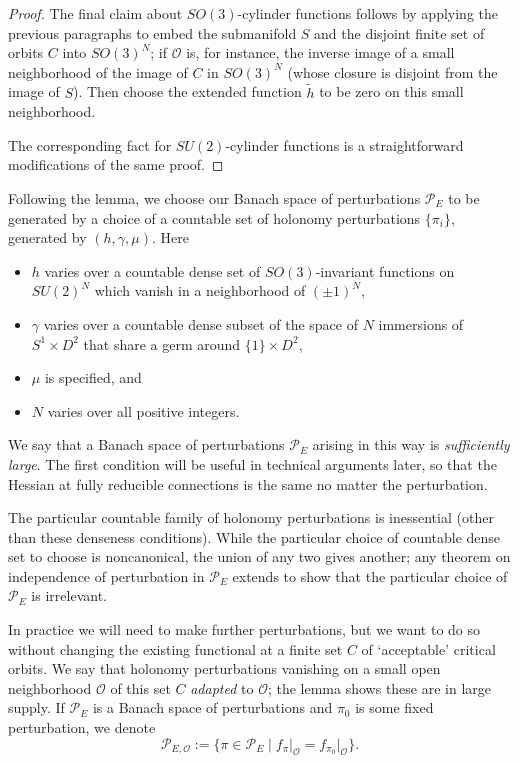 \documentclass[10pt,a4paper]{amsart}
\theoremstyle{definition}
\theoremstyle{remark}
\numberwithin{figure}{qchap}
\begin{document}
\begin{proof}
The final claim about $SO(3)$-cylinder functions follows by applying the previous paragraphs to embed the submanifold $S$ and the disjoint finite set of orbits $C$ into $SO(3)^N$; if $\mathcal O$ is, for instance, the inverse image of a small neighborhood of the image of $C$ in $SO(3)^N$ (whose closure is disjoint from the image of $S$). Then choose the extended function $\tilde h$ to be zero on this small neighborhood.

The corresponding fact for $SU(2)$-cylinder functions is a straightforward modifications of the same proof.
\end{proof}

Following the lemma, we choose our Banach space of perturbations $\mathcal P_E$ to be generated by a choice of a countable set of holonomy perturbations $\{\pi_i\}$, generated by $(h, \gamma, \mu)$. Here 
\begin{itemize}
\item $h$ varies over a countable dense set of $SO(3)$-invariant functions on $SU(2)^N$ which vanish in a neighborhood of $(\pm 1)^N$,
\item $\gamma$ varies over a countable dense subset of the space of $N$ immersions of $S^1 \times D^2$ that share a germ around $\{1\} \times D^2$, 
\item $\mu$ is specified, and 
\item $N$ varies over all positive integers. 
\end{itemize} 

We say that a Banach space of perturbations $\mathcal P_E$ arising in this way is \textit{sufficiently large}. The first condition will be useful in technical arguments later, so that the Hessian at fully reducible connections is the same no matter the perturbation.

The particular countable family of holonomy perturbations is inessential (other than these denseness conditions). While the particular choice of countable dense set to choose is noncanonical, the union of any two gives another; any theorem on independence of perturbation in $\mathcal P_E$ extends to show that the particular choice of $\mathcal P_E$ is irrelevant. 

In practice we will need to make further perturbations, but we want to do so without changing the existing functional at a finite set $C$ of `acceptable' critical orbits. We say that holonomy perturbations vanishing on a small open neighborhood $\mathcal O$ of this set $C$ \textit{adapted} to $\mathcal O$; the lemma shows these are in large supply. If $\mathcal P_E$ is a Banach space of perturbations and $\pi_0$ is some fixed perturbation, we denote $$\mathcal P_{E,\mathcal O} := \{\pi \in \mathcal P_E \mid f_\pi\big|_{\mathcal O} = f_{\pi_0}\big|_{\mathcal O}\}.$$
\end{document}
